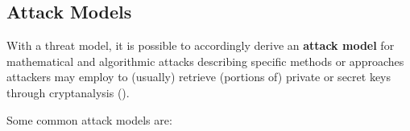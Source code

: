 \subsection{Attack Models}\label{sec:cryptographic_security_overview:attack_model}

With a threat model, it is possible to accordingly derive an \textbf{attack model} for mathematical and algorithmic attacks describing specific methods or approaches attackers may employ to (usually) retrieve (portions of) private or secret keys through cryptanalysis ().


Some common attack models are:

